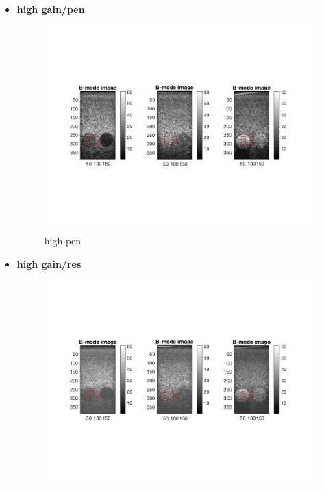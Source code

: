 \documentclass[12pts,a4paper]{article}
\begin{document}
\begin{itemize}
\item{\textbf{high gain/pen}}
\begin{center}
\end{center}
\begin{figure}[h]
    \centering
    \includegraphics[width=1.0\textwidth]{img_hw3/high_pen.jpg}
    \caption{high-pen}
    \label{fig:mesh1}
\end{figure}
\pagebreak
\item{\textbf{high gain/res}}
\begin{center}
\end{center}
\begin{figure}[h]
    \centering
    \includegraphics[width=1.0\textwidth]{img_hw3/high_res.jpg}

\end{figure}
\end{itemize}
\end{document}
